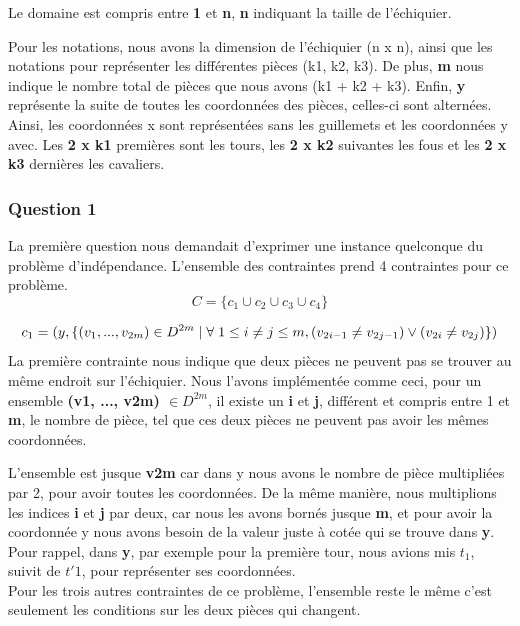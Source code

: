 \documentclass{article}
\begin{document}
Le domaine est compris entre \textbf{1} et \textbf{n}, \textbf{n} indiquant la taille de l'échiquier.

Pour les notations, nous avons la dimension de l'échiquier (n x n), ainsi que les notations pour représenter les différentes pièces (k1, k2, k3). 
De plus, \textbf{m} nous indique le nombre total de pièces que nous avons (k1 + k2 + k3). 
Enfin, \textbf{y} représente la suite de toutes les coordonnées des pièces, celles-ci sont alternées. Ainsi, les coordonnées x sont représentées sans les guillemets et les coordonnées y avec. Les \textbf{2 x k1} premières sont les tours, les \textbf{2 x k2} suivantes les fous et les \textbf{2 x k3} dernières les cavaliers.

\subsubsection{Question 1}
La première question nous demandait d'exprimer une instance quelconque du problème d'indépendance. L'ensemble des contraintes prend 4 contraintes pour ce problème.
$$C = \{c_{1} \cup c_{2} \cup c_{3} \cup c_{4}\} $$

$$c_{1} = ( y, \{ (v_{1}, ..., v_{2m}) \in  D^{2m} \mid \forall \hspace{0.1cm}  1\leq i \neq j \leq m, (v_{2i-1} \neq v_{2j-1}) \vee  (v_{2i} \neq v_{2j}) \} ) $$
La première contrainte nous indique que deux pièces ne peuvent pas se trouver au même endroit sur l'échiquier. 
Nous l'avons implémentée comme ceci, pour un ensemble \textbf{(v1, ..., v2m) $\in D^{2m}$}, il existe un \textbf{i} et \textbf{j}, différent et compris entre 1 et \textbf{m}, le nombre de pièce, tel que ces deux pièces ne peuvent pas avoir les mêmes coordonnées. 

L'ensemble est jusque \textbf{v2m} car dans y nous avons le nombre de pièce multipliées par 2, pour avoir toutes les coordonnées. De la même manière, nous multiplions les indices \textbf{i} et \textbf{j} par deux, car nous les avons bornés jusque \textbf{m}, et pour avoir la coordonnée y nous avons besoin de la valeur juste à cotée qui se trouve dans \textbf{y}. Pour rappel, dans \textbf{y}, par exemple pour la première tour, nous avions mis $t_{1}$, suivit de $t'{1}$, pour représenter ses coordonnées.\\

Pour les trois autres contraintes de ce problème, l'ensemble reste le même c'est seulement les conditions sur les deux pièces qui changent. \\
\end{document}
